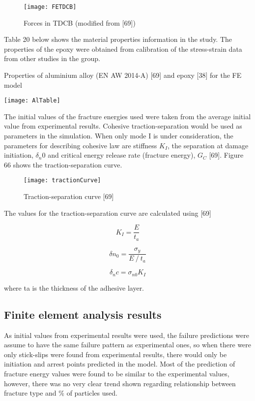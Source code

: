 \documentclass[numbers=noendperiod,chapterprefix=on]{icldt} %
\begin{document}
\begin{figure}[!htpb]
\centering
\texttt{[image: FETDCB]}
\caption{Forces in TDCB (modified from [69])}
\end{figure}
\FloatBarrier

Table 20 below shows the material properties information in the study. The properties of the epoxy were obtained from calibration of the stress-strain data from other studies in the group.


\begin{table}[!htpb]
\centering
\caption{Properties of aluminium alloy (EN AW 2014-A) [69] and epoxy [38] for the FE model} %
\texttt{[image: AlTable]}
\end{table}
\FloatBarrier

The initial values of the fracture energies used were taken from the average initial value from experimental results.
Cohesive traction-separation would be used as parameters in the simulation. When only mode I is under consideration, the parameters for describing cohesive law are stiffness $K_I$, the separation at damage initiation, $\delta_n0$ and critical energy release rate (fracture energy), $G_C$ [69]. Figure 66 shows the traction-separation curve. 

\begin{figure}[!htpb]
\centering
\texttt{[image: tractionCurve]}
\caption{Traction-separation curve [69]}
\end{figure}
\FloatBarrier

The values for the traction-separation curve are calculated using [69]

\begin{equation} 
K_I  =\frac{E}{t_a}
\end{equation}

\begin{equation} 
\delta n_0=\frac{\sigma_y}{E⁄t_a}
\end{equation}

\begin{equation} 
\delta_nc=\sigma_{n0} K_I
\end{equation}

where ta is the thickness of the adhesive layer. 


\subsection{Finite element analysis results}
As initial values from experimental results were used, the failure predictions were assume to have the same failure pattern as experimental ones, so when there were only stick-slips were found from experimental results, there would only be initiation and arrest points predicted in the model. Most of the prediction of fracture energy values were found to be similar to the experimental values, however, there was no very clear trend shown regarding relationship between fracture type and \% of particles used.
\end{document}
